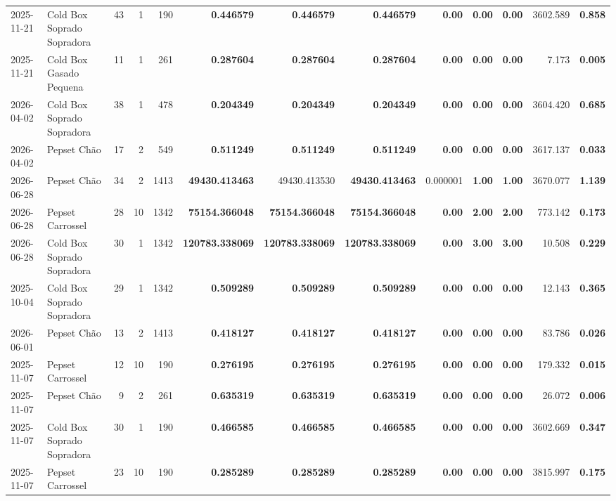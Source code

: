 {\begin{center}
{\begin{tabular}{@{}llrrrrrrrrrrr@{}}
2025-11-21 & Cold Box Soprado Sopradora & 43 & 1 & 190 & \textbf{0.446579} & \textbf{0.446579} & \textbf{0.446579} & \textbf{0.00} & \textbf{0.00} & \textbf{0.00} & 3602.589 & \textbf{0.858} \\
2025-11-21 & Cold Box Gasado Pequena & 11 & 1 & 261 & \textbf{0.287604} & \textbf{0.287604} & \textbf{0.287604} & \textbf{0.00} & \textbf{0.00} & \textbf{0.00} & 7.173 & \textbf{0.005} \\
2026-04-02 & Cold Box Soprado Sopradora & 38 & 1 & 478 & \textbf{0.204349} & \textbf{0.204349} & \textbf{0.204349} & \textbf{0.00} & \textbf{0.00} & \textbf{0.00} & 3604.420 & \textbf{0.685} \\
2026-04-02 & Pepset Chão & 17 & 2 & 549 & \textbf{0.511249} & \textbf{0.511249} & \textbf{0.511249} & \textbf{0.00} & \textbf{0.00} & \textbf{0.00} & 3617.137 & \textbf{0.033} \\
2026-06-28 & Pepset Chão & 34 & 2 & 1413 & \textbf{49430.413463} & 49430.413530 & \textbf{49430.413463} & 0.000001 & \textbf{1.00} & \textbf{1.00} & 3670.077 & \textbf{1.139} \\
2026-06-28 & Pepset Carrossel & 28 & 10 & 1342 & \textbf{75154.366048} & \textbf{75154.366048} & \textbf{75154.366048} & \textbf{0.00} & \textbf{2.00} & \textbf{2.00} & 773.142 & \textbf{0.173} \\
2026-06-28 & Cold Box Soprado Sopradora & 30 & 1 & 1342 & \textbf{120783.338069} & \textbf{120783.338069} & \textbf{120783.338069} & \textbf{0.00} & \textbf{3.00} & \textbf{3.00} & 10.508 & \textbf{0.229} \\
2025-10-04 & Cold Box Soprado Sopradora & 29 & 1 & 1342 & \textbf{0.509289} & \textbf{0.509289} & \textbf{0.509289} & \textbf{0.00} & \textbf{0.00} & \textbf{0.00} & 12.143 & \textbf{0.365} \\
2026-06-01 & Pepset Chão & 13 & 2 & 1413 & \textbf{0.418127} & \textbf{0.418127} & \textbf{0.418127} & \textbf{0.00} & \textbf{0.00} & \textbf{0.00} & 83.786 & \textbf{0.026} \\
2025-11-07 & Pepset Carrossel & 12 & 10 & 190 & \textbf{0.276195} & \textbf{0.276195} & \textbf{0.276195} & \textbf{0.00} & \textbf{0.00} & \textbf{0.00} & 179.332 & \textbf{0.015} \\
2025-11-07 & Pepset Chão & 9 & 2 & 261 & \textbf{0.635319} & \textbf{0.635319} & \textbf{0.635319} & \textbf{0.00} & \textbf{0.00} & \textbf{0.00} & 26.072 & \textbf{0.006} \\
2025-11-07 & Cold Box Soprado Sopradora & 30 & 1 & 190 & \textbf{0.466585} & \textbf{0.466585} & \textbf{0.466585} & \textbf{0.00} & \textbf{0.00} & \textbf{0.00} & 3602.669 & \textbf{0.347} \\
2025-11-07 & Pepset Carrossel & 23 & 10 & 190 & \textbf{0.285289} & \textbf{0.285289} & \textbf{0.285289} & \textbf{0.00} & \textbf{0.00} & \textbf{0.00} & 3815.997 & \textbf{0.175} \\
\bottomrule
\end{tabular}%
}
\end{center}
}
